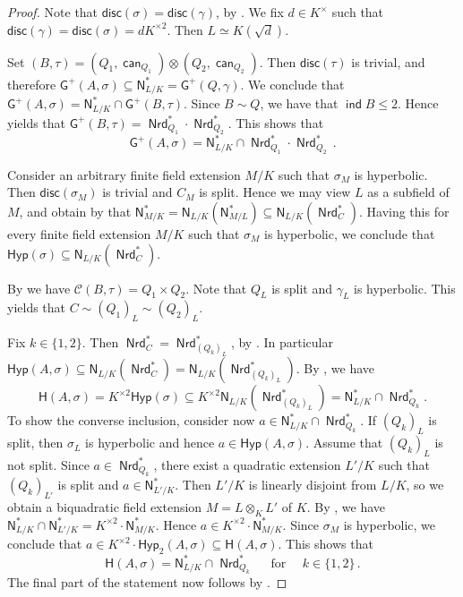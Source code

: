 \documentclass[twoside,11pt]{amsart}
\numberwithin{equation}{section}
\theoremstyle{definition}
\newcommand\ind{\operatorname{\mathsf{ind}}}
\newcommand\Nrd{\operatorname{\mathsf{Nrd}}}
\newcommand\N{\operatorname{N}}
\newcommand{\can}{\operatorname{\mathsf{can}}}
\newcommand{\mg}[1]{{#1}^{\times}}
\newcommand{\sq}[1]{{#1}^{\times 2}}
\newcommand{\s}{\sigma}
\renewcommand{\leq}{\leqslant}
\newcommand{\mc}{\mathcal}
\renewcommand{\N}{\mathsf{N}}
\newcommand{\disc}{\mathsf{disc}}
\newcommand{\G}{\mathsf{G}}
\renewcommand{\H}{\mathsf{H}}
\newcommand{\Hyp}{\mathsf{Hyp}}
\renewcommand{\leq}{\leqslant}
\newcommand{\Cl}{\mc{C}}
\begin{document}
\begin{proof}
Note that $\disc(\s)=\disc(\gamma)$, by \cite[Def.~7.2 \& Prop.~7.5]{KMRT98}.
    We fix $d\in\mg{K}$ such that $\disc(\gamma)=\disc(\s)=d\sq{K}$. 
    Then $L\simeq  K(\sqrt{d})$.
    
  Set $(B,\tau)=(Q_1,\can_{Q_1})\otimes (Q_2,\can_{Q_2})$.
    Then $\disc(\tau)$ is trivial, and therefore $\G^+(A,\s)\subseteq \N_{L/K}^\ast=\G^+(Q,\gamma)$.
    We conclude that 
    $\G^+(A,\s)=\N_{L/K}^\ast\cap \G^+(B,\tau)$.
    Since $B\sim Q$, we have that $\ind B\leq 2$.
    Hence
    \cite[Prop.~4.2~$(c)$]{AB26}
     yields that $\G^+(B,\tau)=\Nrd^\ast_{Q_1}\cdot \Nrd^\ast_{Q_2}$.
    This shows that $$\G^+(A,\s)=\N^\ast_{L/K}\cap \Nrd^\ast_{Q_1}\cdot \Nrd^\ast_{Q_2}\,.$$
    
Consider an arbitrary finite field extension $M/K$ such that $\sigma_{M}$ is hyperbolic. 
Then $\disc(\s_{M})$ is trivial and $C_{M}$ is split. 
Hence we may view $L$ as a subfield of $M$, and obtain by \cite[Prop.~4.1~$(b)$]{AB26} that $\N_{M/K}^\ast=\N_{L/K}(\N_{M/L}^\ast)\subseteq\N_{L/K}(\Nrd_C^\ast)$.
Having this for every finite field extension $M/K$ such that $\s_{M}$ is hyperbolic, we conclude that $\Hyp(\sigma)\subseteq\N_{L/K}(\Nrd_C^\ast)$.

By \cite[p.~93, Examples.~$(b)$]{KMRT98} we have $\Cl(B,\tau)=Q_1\times Q_2$.
Note that $Q_L$ is split and $\gamma_L$ is hyperbolic.
This yields that $C\sim (Q_1)_L\sim (Q_2)_L$.

Fix $k\in\{1,2\}$.
Then $\Nrd_C^\ast=\Nrd_{(Q_k)_L}^\ast$, by \cite[Prop.~4.1~$(a)$]{AB26}.
In particular $\Hyp(A,\sigma)\subseteq\N_{L/K}(\Nrd_C^\ast)=\N_{L/K}(\Nrd_{(Q_k)_L}^\ast)$.
    By \cite[Lemma 10]{Mer96}, we have 
    $$\H(A,\s)=\sq{K}\Hyp(\s)\subseteq \sq{K}\N_{L/K}(\Nrd_{(Q_k)_L}^\ast)= \N_{L/K}^\ast\cap \Nrd_{Q_k}^\ast.$$
    To show the converse inclusion, consider now $a\in\N_{L/K}^\ast\cap\Nrd_{Q_k}^\ast$.
    If $(Q_k)_L$ is split, then 
    $\s_L$ is hyperbolic and hence $a\in\Hyp(A,\s)$.
    Assume that $(Q_k)_L$ is not split.
    Since $a\in\Nrd_{Q_k}^\ast$, there exist a quadratic extension $L'/K$ such that 
    $(Q_k)_{L'}$ is split and $a\in\N_{L'/K}^\ast$.
    Then $L'/K$ is linearly disjoint from $L/K$, so we obtain a biquadratic field extension $M=L\otimes_KL'$ of $K$.
    By \cite[Lemma 2.11]{PTW12}, we have  $\N_{L/K}^\ast\cap \N_{L'/K}^\ast=\sq{K}\cdot \N_{M/K}^\ast$.
    Hence $a\in\sq{K}\cdot \N_{M/K}^\ast$.
    Since $\s_{M}$ is hyperbolic, we conclude that $a\in\sq{K}\cdot\Hyp_2(A,\s)\subseteq \H(A,\s)$.  
    This shows that $$\H(A,\s)=\N_{L/K}^\ast\cap \Nrd_{Q_k}^\ast\quad\text{ for }\quad k\in\{1,2\}\,.$$
The final part of the statement now follows by .
\end{proof}
\end{document}
